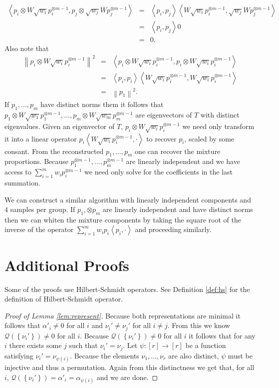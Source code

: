 \documentclass[aos]{imsart}
\def\l{\left}
\def\r{\right}
\def\sQ{\mathscr{Q}}
\theoremstyle{plain}
\theoremstyle{defintion}
\begin{document}
	\begin{eqnarray*}
		\l< p_i\otimes W \sqrt{w_i} p_i^{\otimes m-1} ,  p_j\otimes \sqrt{w_j}W p_j^{\otimes m-1}\r>
		&=&\l<p_i,p_j\r> \l<  W \sqrt{w_i} p_i^{\otimes m-1} ,\sqrt{w_j}W p_j^{\otimes m-1}\r>\\
		&=&\l<p_i,p_j\r> 0 \\
		&=& 0.
	\end{eqnarray*}
	Also note that 
	\begin{eqnarray*}
		\l\| p_i\otimes W \sqrt{w_i} p_i^{\otimes m-1} \r\|^2
		&=&\l< p_i\otimes W \sqrt{w_i} p_i^{\otimes m-1} ,p_i\otimes W \sqrt{w_i} p_i^{\otimes m-1} \r>\\
		&=&\l< p_i ,p_i \r>\l<W \sqrt{w_i} p_i^{\otimes m-1},W \sqrt{w_i} p_i^{\otimes m-1} \r> \\
		&=&\l\|p_1\r\|^2.
	\end{eqnarray*}
	If $p_1,\ldots,p_m$ have distinct norms them it follows that $p_1\otimes W \sqrt{w_1} p_1^{\otimes m-1},\ldots,p_m\otimes W \sqrt{w_m} p_m^{\otimes m-1}$ are eigenvectors of $T$ with distinct eigenvalues. Given an eigenvector of $T$, $p_i\otimes W \sqrt{w_i} p_i^{\otimes m-1}$ we need only transform it into a linear operator $p_i\l< W \sqrt{w_i} p_i^{\otimes m-1},\cdot\r>$  to recover $p_i$, scaled by some consant. From the reconstructed $p_1,\ldots,p_m$ one can recover the mixture proportions. Because $p_1^{\otimes m-1},\ldots,p_m^{\otimes m-1}$ are linearly independent and we have access to $\sum_{i=1}^m w_i p_i^{\otimes m-1}$ we need only solve for the coefficients in the last summation.

	We can construct a similar algorithm with linearly independent components and $4$ samples per group. If $p_1,\otimes p_m$ are linearly independent and have distinct norms then we can whiten the mixture components by taking the square root of the inverse of the operator $\sum_{i=1}^m w_i p_i \l<p_i,\cdot\r>$ and proceeding similarly.
	
	
	\appendix
			\section{Additional Proofs}
	Some of the proofs use Hilbert-Schmidt operators. See Definition \ref{def:hs} for the definition of Hilbert-Schmidt operator.
	\begin{proof}[Proof of Lemma \ref{lem:represent}]
		Because both representations are minimal it follows that $\alpha'_i \neq 0$ for all $i$ and $\nu_i' \neq \nu_j'$ for all $i \neq j$. From this we know $\sQ\left( \l\{\nu_i'\r\} \right) \neq 0$ for all $i$. Because $\sQ\left( \l\{\nu_i'\r\} \right) \neq 0$ for all $i$ it follows that for any $i$ there exists some $j$ such that $\nu_i' = \nu_j$. Let $\psi: \left[ r \right] \to \left[ r \right]$ be a function satisfying $\nu_i' = \nu_{\psi\left( i \right)}$. Because the elements $\nu_1,\ldots,\nu_r$ are also distinct, $\psi$ must be injective and thus a permutation. Again from this distinctness we get that, for all $i$, $\sQ\left( \left\{ \nu_i' \right\}  \right)= \alpha'_i =\alpha_{\psi\left( i \right)}$ and we are done.
	\end{proof}
\end{document}
